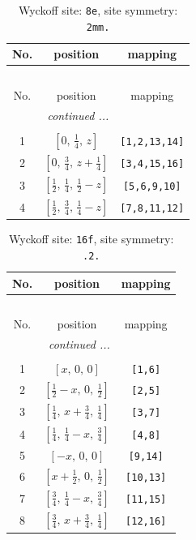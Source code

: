 \documentclass[fleqn,8pt]{jsarticle}
\begin{document}
\renewcommand{\arraystretch}{1.2}
\begin{longtable}{ccc}
\caption{Wyckoff site: {\tt 8e}, site symmetry: {\tt 2mm.}}
 \\
 \hline \hline
No. & position & mapping \\ \hline \endfirsthead

\multicolumn{2}{l}{\tablename\ \thetable{}} \\
 \hline \hline
No. & position & mapping \\ \hline \endhead

 \hline \hline
\multicolumn{2}{r}{\footnotesize\it continued ...} \\ \endfoot

 \hline \hline
\multicolumn{2}{r}{} \\ \endlastfoot

1 & $\left[ 0,\, \frac{1}{4},\, z \right]$ & {\tt [1,2,13,14]} \\ \hline
2 & $\left[ 0,\, \frac{3}{4},\, z + \frac{1}{4} \right]$ & {\tt [3,4,15,16]} \\ \hline
3 & $\left[ \frac{1}{2},\, \frac{1}{4},\, \frac{1}{2} - z \right]$ & {\tt [5,6,9,10]} \\ \hline
4 & $\left[ \frac{1}{2},\, \frac{3}{4},\, \frac{1}{4} - z \right]$ & {\tt [7,8,11,12]} \\
\end{longtable}
\renewcommand{\arraystretch}{1.2}
\begin{longtable}{ccc}
\caption{Wyckoff site: {\tt 16f}, site symmetry: {\tt .2.}}
 \\
 \hline \hline
No. & position & mapping \\ \hline \endfirsthead

\multicolumn{2}{l}{\tablename\ \thetable{}} \\
 \hline \hline
No. & position & mapping \\ \hline \endhead

 \hline \hline
\multicolumn{2}{r}{\footnotesize\it continued ...} \\ \endfoot

 \hline \hline
\multicolumn{2}{r}{} \\ \endlastfoot

1 & $\left[ x,\, 0,\, 0 \right]$ & {\tt [1,6]} \\ \hline
2 & $\left[ \frac{1}{2} - x,\, 0,\, \frac{1}{2} \right]$ & {\tt [2,5]} \\ \hline
3 & $\left[ \frac{1}{4},\, x + \frac{3}{4},\, \frac{1}{4} \right]$ & {\tt [3,7]} \\ \hline
4 & $\left[ \frac{1}{4},\, \frac{1}{4} - x,\, \frac{3}{4} \right]$ & {\tt [4,8]} \\ \hline
5 & $\left[ - x,\, 0,\, 0 \right]$ & {\tt [9,14]} \\ \hline
6 & $\left[ x + \frac{1}{2},\, 0,\, \frac{1}{2} \right]$ & {\tt [10,13]} \\ \hline
7 & $\left[ \frac{3}{4},\, \frac{1}{4} - x,\, \frac{3}{4} \right]$ & {\tt [11,15]} \\ \hline
8 & $\left[ \frac{3}{4},\, x + \frac{3}{4},\, \frac{1}{4} \right]$ & {\tt [12,16]} \\
\end{longtable}
\end{document}
